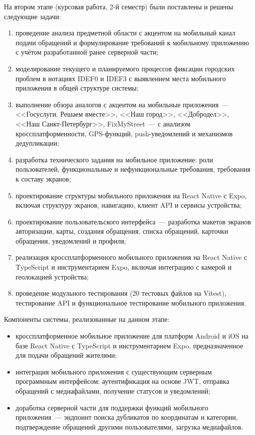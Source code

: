 На втором этапе (курсовая работа, 2-й семестр) были поставлены и решены следующие задачи:
\begin{enumerate}
    \item проведение анализа предметной области с акцентом на мобильный канал подачи
          обращений и формулирование требований к мобильному приложению с учётом
          разработанной ранее серверной части;
    \item моделирование текущего и планируемого процессов фиксации городских проблем
          в нотациях IDEF0 и IDEF3 с выявлением места мобильного приложения
          в общей структуре системы;
    \item выполнение обзора аналогов с акцентом на мобильные приложения~---
          <<Госуслуги. Решаем вместе>>, <<Наш город>>, <<Добродел>>,
          <<Наш Санкт-Петербург>>, FixMyStreet~--- с анализом кроссплатформенности,
          GPS-функций, push-уведомлений и механизмов дедупликации;
    \item разработка технического задания на мобильное приложение: роли пользователей,
          функциональные и нефункциональные требования, требования к составу экранов;
    \item проектирование структуры мобильного приложения на React Native с Expo,
          включая структуру экранов, навигацию, клиент API и сервисы устройства;
    \item проектирование пользовательского интерфейса~--- разработка макетов
          экранов авторизации, карты, создания обращения, списка обращений,
          карточки обращения, уведомлений и профиля;
    \item реализация кроссплатформенного мобильного приложения на React Native
          с TypeScript и инструментарием Expo, включая интеграцию с камерой
          и геолокацией устройства;
    \item проведение модульного тестирования (20 тестовых файлов на Vitest),
          тестирование API и функциональное тестирование мобильного приложения.
\end{enumerate}

Компоненты системы, реализованные на данном этапе:
\begin{itemize}
    \item кроссплатформенное мобильное приложение для платформ Android и iOS на базе
          React Native с TypeScript и инструментарием Expo, предназначенное
          для подачи обращений жителями;
    \item интеграция мобильного приложения с существующим серверным программным
          интерфейсом: аутентификация на основе JWT, отправка обращений с медиафайлами,
          получение статусов и уведомлений;
    \item доработка серверной части для поддержки функций мобильного приложения~---
          эндпоинт поиска дубликатов по координатам и категории, подтверждение
          обращений другими пользователями, загрузка медиафайлов.
\end{itemize}

